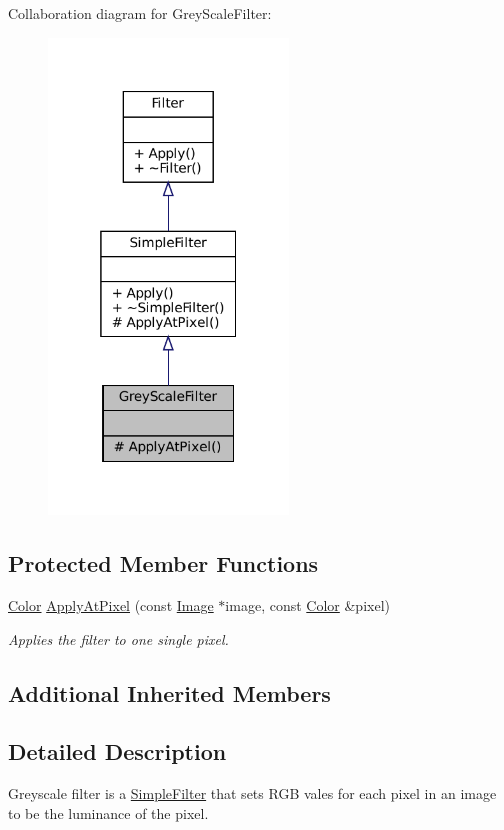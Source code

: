 Collaboration diagram for Grey\+Scale\+Filter\+:\nopagebreak
\begin{figure}[H]
\begin{center}
\leavevmode
\includegraphics[width=181pt]{classGreyScaleFilter__coll__graph}
\end{center}
\end{figure}
\subsection*{Protected Member Functions}
\begin{DoxyCompactItemize}
\item 
\hyperlink{classColor}{Color} \hyperlink{classGreyScaleFilter_a4b86977b204bf2699c4d138d6d0a1116}{Apply\+At\+Pixel} (const \hyperlink{classImage}{Image} $\ast$image, const \hyperlink{classColor}{Color} \&pixel)
\begin{DoxyCompactList}\small\item\em Applies the filter to one single pixel. \end{DoxyCompactList}\end{DoxyCompactItemize}
\subsection*{Additional Inherited Members}


\subsection{Detailed Description}
Greyscale filter is a \hyperlink{classSimpleFilter}{Simple\+Filter} that sets R\+GB vales for each pixel in an image to be the luminance of the pixel. 

